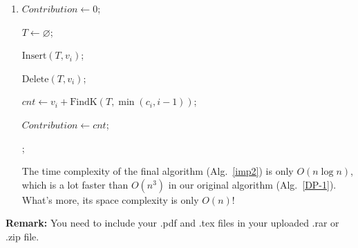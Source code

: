 \documentclass[12pt,a4paper]{article}
\makeatletter
\newtheorem*{solution}{Solution}
\theoremstyle{definition}
\renewenvironment{solution}[1][Solution] {\par\pushQED{\qed}\normalfont\topsep6\p@\@plus6\p@\relax\trivlist\item[\hskip\labelsep\bfseries#1\@addpunct{.}]\ignorespaces}{\popQED\endtrivlist\@endpefalse} \makeatother
\makeatother
\begin{document}
\begin{enumerate}
\begin{solution}
\begin{minipage}[t]{0.9\textwidth}
\begin{algorithm}[H]
            $Contribution \leftarrow 0$;

            $T \leftarrow \varnothing$;


             {
                $\mathrm{Insert}(T, v_i)$;

            }

             {
                $\mathrm{Delete}(T, v_i)$;


                $cnt \leftarrow v_i + \mathrm{FindK}(T, \min(c_i, i-1))$;


                 {
                    $Contribution \leftarrow cnt$;
                }
            }
            ;
        \end{algorithm}
        \end{minipage}

        The time complexity of the final algorithm (Alg.~\ref{imp2}) is only $O(n\log{n})$, which is a lot faster than $O(n^3)$ in our original algorithm (Alg.~\ref{DP-1}). What's more, its space complexity is only $O(n)$!
    \end{solution}
\end{enumerate}

\vspace{20pt}

\textbf{Remark:} You need to include your .pdf and .tex files in your uploaded .rar or .zip file.

\end{document}
